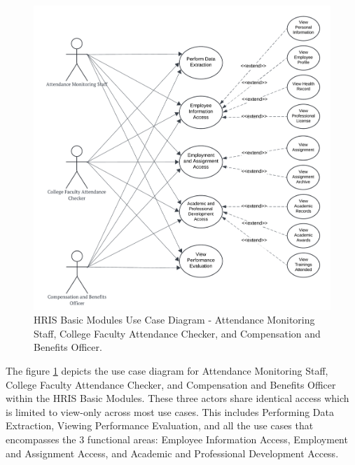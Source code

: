     \begin{figure}[H]
        \centering
        \includegraphics[width=0.9\linewidth]{figures/images/diagrams/usecase/use-case-basic-2.png}
        \caption{HRIS Basic Modules Use Case Diagram - Attendance Monitoring Staff, College Faculty Attendance Checker, and Compensation and Benefits Officer.}
        \label{fig:use-case-basic-2}
    \end{figure}

    The figure \ref{fig:use-case-basic-2} depicts the use case diagram for Attendance Monitoring Staff, College Faculty Attendance Checker, and Compensation and Benefits Officer within the HRIS Basic Modules. These three actors share identical access which is limited to view-only across most use cases. This includes Performing Data Extraction, Viewing Performance Evaluation, and all the use cases that encompasses the 3 functional areas: Employee Information Access, Employment and Assignment Access, and Academic and Professional Development Access. 


